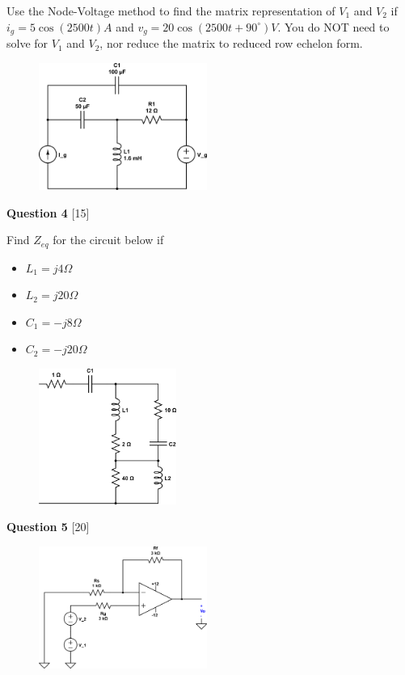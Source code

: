 \documentclass[12pt]{article}
\begin{document}
Use the Node-Voltage method to find the matrix representation of $V_1$ and $V_2$ if $i_g = 5 \cos{(2500t)} A$ and $v_g = 20\cos{(2500t+ 90^{\circ})} V$. You do NOT need to solve for $V_1$ and $V_2$, nor reduce the matrix to reduced row echelon form.

\begin{figure}[h!]
\centering 
\includegraphics[clip,width=0.49\textwidth]{final_3.png}
\end{figure}

\newpage

{\bf Question 4} [15]
\newline

Find $Z_{eq}$ for the circuit below if
\begin{itemize}
\item $L_1 = j4 \Omega$
\item $L_2 = j20 \Omega$
\item $C_1 = -j8 \Omega$
\item $C_2 = -j20 \Omega$
\end{itemize}

\begin{figure}[h!]
\centering 
\includegraphics[clip,width=0.40\textwidth]{final_4.png}
\end{figure}

\newpage


{\bf Question 5} [20]
\newline

\begin{figure}[h!]
\centering 
\includegraphics[clip,width=0.49\textwidth]{final_5.png}
\end{figure}
\end{document}
